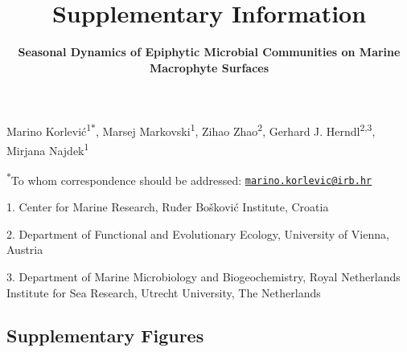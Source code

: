 \documentclass[12pt,]{article}
\title{\textbf{Supplementary Information}}
\subtitle{\textbf{Seasonal Dynamics of Epiphytic Microbial Communities on Marine
Macrophyte Surfaces}}
\author{}
\date{}
\begin{document}
\maketitle

\vspace{60mm}

Marino Korlević\textsuperscript{1\(*\)}, Marsej
Markovski\textsuperscript{1}, Zihao Zhao\textsuperscript{2}, Gerhard J.
Herndl\textsuperscript{2,3}, Mirjana Najdek\textsuperscript{1}

\vspace{40mm}

\textsuperscript{\(*\)}To whom correspondence should be addressed:
\href{mailto:marino.korlevic@irb.hr}{\nolinkurl{marino.korlevic@irb.hr}}

1. Center for Marine Research, Ruđer Bošković Institute, Croatia

2. Department of Functional and Evolutionary Ecology, University of
Vienna, Austria

3. Department of Marine Microbiology and Biogeochemistry, Royal
Netherlands Institute for Sea Research, Utrecht University, The
Netherlands

\setlength\parindent{24pt}

\hypertarget{supplementary-figures}{%
\subsection{Supplementary Figures}\label{supplementary-figures}}
\end{document}
